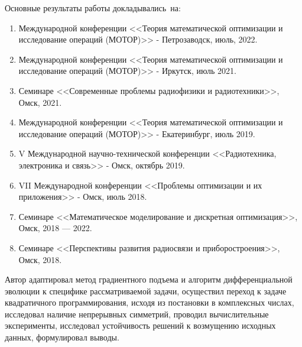 {\probation}
Основные результаты работы докладывались~на:
\begin{enumerate}[beginpenalty=10000] %
  \item Международной конференции <<Теория математической оптимизации и исследование операций (МОТОР)>> - Петрозаводск, июль, 2022.
  \item Международной конференции <<Теория математической оптимизации и исследование операций (МОТОР)>> -  Иркутск, июль 2021.
  \item Семинаре <<Современные проблемы радиофизики и радиотехники>>, Омск, 2021.
  \item Международной конференции <<Теория математической оптимизации и исследование операций (МОТОР)>> - Екатеринбург, июль 2019.
  \item V Международной научно-технической конференции <<Радиотехника, электроника и связь>> - Омск, октябрь 2019.
  \item VII Международной конференции <<Проблемы оптимизации и их приложения>> - Омск, июль 2018.
  \item Семинаре <<Математическое моделирование и дискретная оптимизация>>, Омск, 2018 --- 2022.
  \item Семинаре <<Перспективы развития радиосвязи и приборостроения>>, Омск, 2018. 
\end{enumerate}

{\contribution} Автор адаптировал метод градиентного подъема и алгоритм дифференциальной эволюции к специфике рассматриваемой задачи, осуществил переход к задаче квадратичного программирования, исходя из постановки в комплексных числах, исследовал наличие непрерывных симметрий, проводил вычислительные эксперименты, исследовал устойчивость решений к возмущению исходных данных, формулировал выводы.


